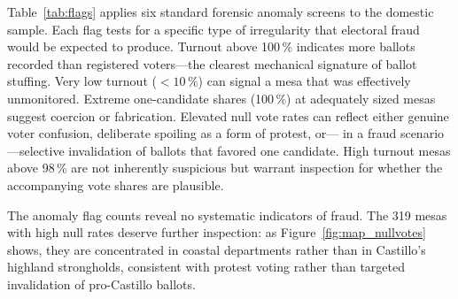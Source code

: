 \documentclass[12pt]{article}
\begin{document}
Table~\ref{tab:flags} applies six standard forensic anomaly screens to the
domestic sample. Each flag tests for a specific type of irregularity that
electoral fraud would be expected to produce. Turnout above 100\,\% indicates
more ballots recorded than registered voters---the clearest mechanical signature
of ballot stuffing. Very low turnout ($<10\,\%$) can signal a mesa that was
effectively unmonitored. Extreme one-candidate shares (100\,\%) at adequately
sized mesas suggest coercion or fabrication. Elevated null vote rates can reflect
either genuine voter confusion, deliberate spoiling as a form of protest, or---
in a fraud scenario---selective invalidation of ballots that favored one
candidate. High turnout mesas above 98\,\% are not inherently suspicious but
warrant inspection for whether the accompanying vote shares are plausible.

The anomaly flag counts reveal no systematic indicators of fraud. The 319 mesas
with high null rates deserve further inspection: as Figure~\ref{fig:map_nullvotes}
shows, they are concentrated in coastal departments rather than in Castillo's
highland strongholds, consistent with protest voting rather than targeted
invalidation of pro-Castillo ballots.
\end{document}
